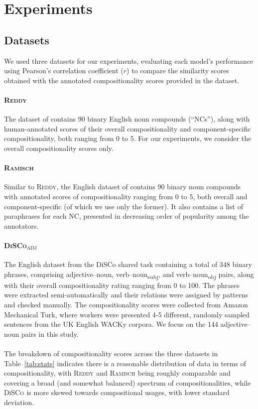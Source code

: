 \documentclass[11pt,a4paper]{article}
\newcommand{\dataset}[2][]{\textsc{#2}$_{\text{#1}}$\xspace}
\newcommand{\reddy}{\dataset{Reddy}}
\newcommand{\ramisch}{\dataset{Ramisch}}
\newcommand{\discoj}[1][]{\dataset[#1]{DiSCo}}
\newcommand{\tabref}[2][]{Table#1~\ref{#2}\xspace}
\begin{document}
\section{Experiments}
\subsection{Datasets}
\label{sec:datasets}
We used three datasets for our experiments, evaluating each model's performance using Pearson's correlation coefficient ($r$) to compare the similarity scores obtained with the annotated compositionality scores provided in the dataset.
\paragraph{\reddy}
The dataset of  contains 90 binary English noun compounds (``NCs''), along with human-annotated scores of their overall compositionality and component-specific compositionality, both ranging from 0 to 5. For our experiments, we consider the overall compositionality scores only.

\paragraph{\ramisch}
Similar to \reddy, the English dataset of \citet{Ramisch2016} contains 90 binary noun compounds with annotated scores of compositionality ranging from 0 to 5, both overall and component-specific (of which we use only the former). It also contains a list of paraphrases for each NC, presented in decreasing order of popularity among the annotators.

\paragraph{\discoj[ADJ]}
The English dataset from the DiSCo shared task \cite{Disco2011} containing a total of 348 binary phrases, comprising adjective--noun, verb--noun\textsubscript{subj}, and verb--noun\textsubscript{obj} pairs, along with their overall compositionality rating ranging from 0 to 100. The phrases were extracted semi-automatically and their relations were assigned by patterns and checked manually. The compositionality scores were collected from Amazon Mechanical Turk, where workers were presented 4-5 different, randomly sampled sentences from the UK English WACKy corpora. We focus on the 144 adjective--noun pairs in this study.

\paragraph{}
The breakdown of compositionality scores across the three datasets in \tabref{tab:stats} indicates there is a reasonable distribution of data in terms of compositionality, with \reddy and \ramisch being roughly comparable and covering a broad (and somewhat balanced) spectrum of compositionalities, while \discoj is more skewed towards compositional usages, with lower standard deviation.
\end{document}
